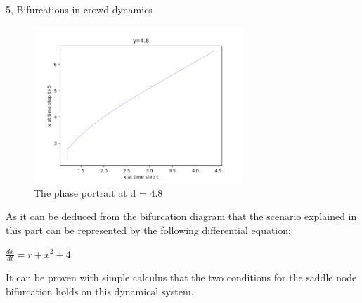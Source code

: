 \documentclass[10pt,a4paper]{article}
\begin{document}
\begin{task}{5, Bifurcations in crowd dynamics}
\begin{figure}[H]
    \centering
    \includegraphics[width=0.7\textwidth]{../plots/task5/0_phase_portrait_y_4_8_second_part.png}
    \caption{The phase portrait at d = 4.8}
    \label{fig:part2_bifurcation}
\end{figure}
As it can be deduced from the bifurcation diagram that the scenario explained in this part can be represented by the following differential equation:
\begin{center}
	$\frac{dx}{dt} = r + x^{2} + 4$
\end{center}
It can be proven with simple calculus that the two conditions for the saddle node bifurcation holds on this dynamical system.
\end{task}
\end{document}
